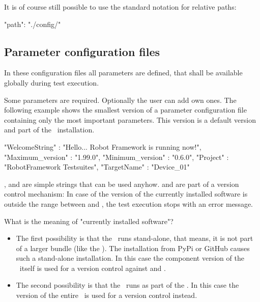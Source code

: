 It is of course still possible to use the standard notation for relative paths:

\begin{pythoncode}
"path": "./config/"
\end{pythoncode}

\newpage

\subsection{Parameter configuration files}
\label{sec:parameter_config_files}

In these configuration files all parameters are defined, that shall be available globally during test execution.

Some parameters are required. Optionally the user can add own ones. The following example shows the smallest version
of a parameter configuration file containing only the most important parameters. This version is a default version and part of the
\pkg\ installation.

\begin{pythoncode}
{
  "WelcomeString"   : "Hello... Robot Framework is running now!",
  "Maximum_version" : "1.99.0",
  "Minimum_version" : "0.6.0",
  "Project"         : "RobotFramework Testsuites",
  "TargetName"      : "Device_01"
}
\end{pythoncode}

,  and  are simple strings that can be used anyhow. 
and  are part of a version control mechanism: In case of the version of the currently installed
software is outside the range between  and , the test execution stops
with an error message.

What is the meaning of "currently installed software"?

\begin{itemize}
   \item The first possibility is that the \pkg\ runs stand-alone, that means, it is not part of a larger bundle (like the \rfw).
         The installation from PyPi or GitHub causes such a stand-alone installation. In this case the component version of
         the \pkg\ itself is used for a version control against  and .
   \item The second possibility is that the \pkg\ runs as part of the \rfw. In this case the version of the entire \rfw\ is used
         for a version control instead.
\end{itemize}

